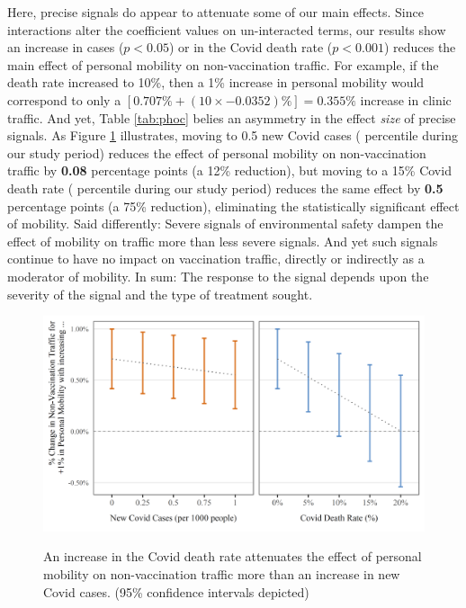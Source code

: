  Here, precise signals do appear to attenuate some of our main effects. Since interactions alter the coefficient values on un-interacted terms, our results show an increase in cases ($p < 0.05$) or in the Covid death rate ($p < 0.001$) reduces the main effect of personal mobility on non-vaccination traffic. For example, if the death rate increased to 10\%, then a 1\% increase in personal mobility would correspond to only a $[0.707\% + (10 \times -0.0352)\%] = 0.355\%$ increase in clinic traffic. And yet, Table \ref{tab:phoc} belies an asymmetry in the effect \textit{size} of precise signals. As Figure \ref{fig:tfk_mod} illustrates, moving to 0.5 new Covid cases ( percentile during our study period) reduces the effect of personal mobility on non-vaccination traffic by \textbf{0.08} percentage points (a 12\% reduction), but moving to a 15\% Covid death rate ( percentile during our study period) reduces the same effect by \textbf{0.5} percentage points (a 75\% reduction), eliminating the statistically significant effect of mobility. Said differently: Severe signals of environmental safety dampen the effect of mobility on traffic more than less severe signals. And yet such signals continue to have no impact on vaccination traffic, directly or indirectly as a moderator of mobility. In sum: The response to the signal depends upon the severity of the signal and the type of treatment sought.
 
\begin{figure}[htbp]
    \centering
    \caption{An increase in the Covid death rate attenuates the effect of personal mobility on non-vaccination traffic more than an increase in new Covid cases. (95\% confidence intervals depicted)} %
    \includegraphics[scale=1]{Figures/VC2/Traffic-Moderation.png}     
    \label{fig:tfk_mod}
\end{figure} 


